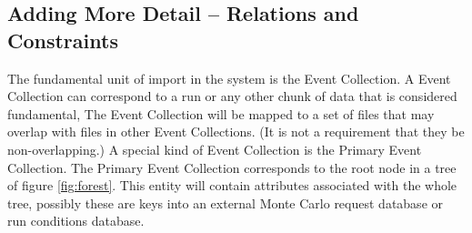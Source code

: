 \documentclass{cmspaper}
\begin{document}
\subsection{Adding More Detail -- Relations and Constraints}


The fundamental unit of import in the system is the Event Collection.  A Event Collection 
can correspond to a run or any other chunk of data that is considered fundamental,  
The Event Collection will be mapped to a set of files that may overlap with files in 
other Event Collections.  (It is not a requirement that they be non-overlapping.) A
special kind of Event Collection is the Primary Event Collection.  The Primary Event Collection
corresponds to the root node in a tree of figure \ref{fig:forest}.  This entity
will contain attributes associated with the whole tree, possibly these are keys into 
an external Monte Carlo request database or run conditions database.
\end{document}
